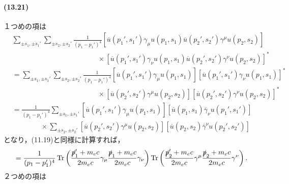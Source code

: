 \paragraph{(13.21)}
１つめの項は
\begin{align*}
  & \sum_{\pm s_1, \pm s_1'} \sum_{\pm s_2, \pm s_2'} \frac{1}{(p_1-p_1')^4} \left[ \overline{u}(p_1',s_1') \gamma_\mu u(p_1, s_1) \overline{u}(p_2',s_2') \gamma^\mu u(p_2, s_2) \right] \\
  & \qquad\qquad\qquad\qquad\qquad\qquad \times \left[ \overline{u}(p_1',s_1') \gamma_\nu u(p_1, s_1) \overline{u}(p_2',s_2') \gamma^\nu u(p_2, s_2) \right]^* \\
  & = \sum_{\pm s_1, \pm s_1'} \sum_{\pm s_2, \pm s_2'} \frac{1}{(p_1-p_1')^4} \left[ \overline{u}(p_1',s_1') \gamma_\mu u(p_1, s_1) \right] \left[ \overline{u}(p_1',s_1') \gamma_\nu u(p_1, s_1) \right]^* \\
  & \qquad\qquad\qquad\qquad\qquad\qquad \times \left[ \overline{u}(p_2',s_2') \gamma^\mu u(p_2, s_2) \right] \left[ \overline{u}(p_2',s_2') \gamma^\nu u(p_2, s_2) \right]^* \\
  & = \frac{1}{(p_1-p_1')^4} \sum_{\pm s_1, \pm s_1'} \left[ \overline{u}(p_1',s_1') \gamma_\mu u(p_1, s_1) \right] \left[ \overline{u}(p_1, s_1) \overline{\gamma}_\nu u(p_1', s_1') \right] \\
  & \qquad\qquad \times \sum_{\pm s_2, \pm s_2'}\left[ \overline{u}(p_2',s_2') \gamma^\mu u(p_2, s_2) \right] \left[ \overline{u}(p_2,s_2) \overline{\gamma}^\nu u(p_2', s_2') \right]
\end{align*}
となり，(11.19)と同様に計算すれば，
\[=\frac{1}{(p_1-p_1')^4} \operatorname{Tr} \left( \frac{\slashed{p}_1'+m_ec}{2m_ec} \gamma_\mu \frac{\slashed{p}_1+m_ec}{2m_ec} \gamma_\nu \right) \operatorname{Tr} \left( \frac{\slashed{p}_2'+m_ec}{2m_ec} \gamma^\mu \frac{\slashed{p}_2+m_ec}{2m_ec} \gamma^\nu \right). \]
２つめの項は
